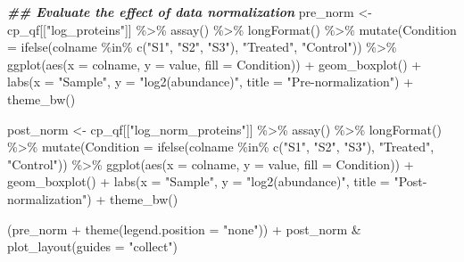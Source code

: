 \documentclass[9pt,a4paper,]{extarticle}
\newenvironment{Shaded}{\begin{snugshade}}{\end{snugshade}}
\newcommand{\AttributeTok}[1]{\textcolor[rgb]{0.77,0.63,0.00}{#1}}
\newcommand{\DocumentationTok}[1]{\textcolor[rgb]{0.56,0.35,0.01}{\textbf{\textit{#1}}}}
\newcommand{\FunctionTok}[1]{\textcolor[rgb]{0.00,0.00,0.00}{#1}}
\newcommand{\NormalTok}[1]{#1}
\newcommand{\OtherTok}[1]{\textcolor[rgb]{0.56,0.35,0.01}{#1}}
\newcommand{\SpecialCharTok}[1]{\textcolor[rgb]{0.00,0.00,0.00}{#1}}
\newcommand{\StringTok}[1]{\textcolor[rgb]{0.31,0.60,0.02}{#1}}
\begin{document}
\begin{Shaded}
\begin{Highlighting}[]
\DocumentationTok{\#\# Evaluate the effect of data normalization}
\NormalTok{pre\_norm }\OtherTok{\textless{}{-}}\NormalTok{ cp\_qf[[}\StringTok{"log\_proteins"}\NormalTok{]] }\SpecialCharTok{\%\textgreater{}\%}
  \FunctionTok{assay}\NormalTok{() }\SpecialCharTok{\%\textgreater{}\%}
  \FunctionTok{longFormat}\NormalTok{() }\SpecialCharTok{\%\textgreater{}\%}
  \FunctionTok{mutate}\NormalTok{(}\AttributeTok{Condition =} \FunctionTok{ifelse}\NormalTok{(colname }\SpecialCharTok{\%in\%} \FunctionTok{c}\NormalTok{(}\StringTok{"S1"}\NormalTok{, }\StringTok{"S2"}\NormalTok{, }\StringTok{"S3"}\NormalTok{),}
                            \StringTok{"Treated"}\NormalTok{, }\StringTok{"Control"}\NormalTok{)) }\SpecialCharTok{\%\textgreater{}\%}
  \FunctionTok{ggplot}\NormalTok{(}\FunctionTok{aes}\NormalTok{(}\AttributeTok{x =}\NormalTok{ colname, }\AttributeTok{y =}\NormalTok{ value, }\AttributeTok{fill =}\NormalTok{ Condition)) }\SpecialCharTok{+}
  \FunctionTok{geom\_boxplot}\NormalTok{() }\SpecialCharTok{+}
  \FunctionTok{labs}\NormalTok{(}\AttributeTok{x =} \StringTok{"Sample"}\NormalTok{, }\AttributeTok{y =} \StringTok{"log2(abundance)"}\NormalTok{, }\AttributeTok{title =} \StringTok{"Pre{-}normalization"}\NormalTok{) }\SpecialCharTok{+}
  \FunctionTok{theme\_bw}\NormalTok{()}

\NormalTok{post\_norm }\OtherTok{\textless{}{-}}\NormalTok{ cp\_qf[[}\StringTok{"log\_norm\_proteins"}\NormalTok{]] }\SpecialCharTok{\%\textgreater{}\%}
  \FunctionTok{assay}\NormalTok{() }\SpecialCharTok{\%\textgreater{}\%}
  \FunctionTok{longFormat}\NormalTok{() }\SpecialCharTok{\%\textgreater{}\%}
  \FunctionTok{mutate}\NormalTok{(}\AttributeTok{Condition =} \FunctionTok{ifelse}\NormalTok{(colname }\SpecialCharTok{\%in\%} \FunctionTok{c}\NormalTok{(}\StringTok{"S1"}\NormalTok{, }\StringTok{"S2"}\NormalTok{, }\StringTok{"S3"}\NormalTok{),}
                            \StringTok{"Treated"}\NormalTok{, }\StringTok{"Control"}\NormalTok{)) }\SpecialCharTok{\%\textgreater{}\%}
  \FunctionTok{ggplot}\NormalTok{(}\FunctionTok{aes}\NormalTok{(}\AttributeTok{x =}\NormalTok{ colname, }\AttributeTok{y =}\NormalTok{ value, }\AttributeTok{fill =}\NormalTok{ Condition)) }\SpecialCharTok{+}
  \FunctionTok{geom\_boxplot}\NormalTok{() }\SpecialCharTok{+}
  \FunctionTok{labs}\NormalTok{(}\AttributeTok{x =} \StringTok{"Sample"}\NormalTok{, }\AttributeTok{y =} \StringTok{"log2(abundance)"}\NormalTok{, }\AttributeTok{title =} \StringTok{"Post{-}normalization"}\NormalTok{) }\SpecialCharTok{+}
  \FunctionTok{theme\_bw}\NormalTok{()}

\NormalTok{(pre\_norm }\SpecialCharTok{+} \FunctionTok{theme}\NormalTok{(}\AttributeTok{legend.position =} \StringTok{"none"}\NormalTok{)) }\SpecialCharTok{+} 
\NormalTok{  post\_norm }\SpecialCharTok{\&} \FunctionTok{plot\_layout}\NormalTok{(}\AttributeTok{guides =} \StringTok{"collect"}\NormalTok{)}
\end{Highlighting}
\end{Shaded}
\end{document}
